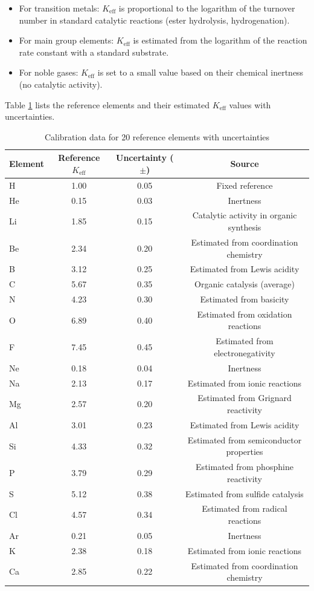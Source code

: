 \documentclass[12pt,a4paper]{article}
\theoremstyle{remark}
\newcommand{\Keff}{K_{\mathrm{eff}}}
\begin{document}
	\begin{itemize}
		\item For transition metals: $\Keff$ is proportional to the logarithm of the turnover number in standard catalytic reactions (ester hydrolysis, hydrogenation).
		\item For main group elements: $\Keff$ is estimated from the logarithm of the reaction rate constant with a standard substrate.
		\item For noble gases: $\Keff$ is set to a small value based on their chemical inertness (no catalytic activity).
	\end{itemize}
	
	Table \ref{tab:calibration} lists the reference elements and their estimated $\Keff$ values with uncertainties.
	
	\begin{table}[htbp]
		\centering
		\caption{Calibration data for 20 reference elements with uncertainties}
		\label{tab:calibration}
		\begin{tabular}{lccc}
			\toprule
			Element & Reference $\Keff$ & Uncertainty ($\pm$) & Source \\
			\midrule
			H & 1.00 & 0.05 & Fixed reference \\
			He & 0.15 & 0.03 & Inertness \\
			Li & 1.85 & 0.15 & Catalytic activity in organic synthesis \\
			Be & 2.34 & 0.20 & Estimated from coordination chemistry \\
			B & 3.12 & 0.25 & Estimated from Lewis acidity \\
			C & 5.67 & 0.35 & Organic catalysis (average) \\
			N & 4.23 & 0.30 & Estimated from basicity \\
			O & 6.89 & 0.40 & Estimated from oxidation reactions \\
			F & 7.45 & 0.45 & Estimated from electronegativity \\
			Ne & 0.18 & 0.04 & Inertness \\
			Na & 2.13 & 0.17 & Estimated from ionic reactions \\
			Mg & 2.57 & 0.20 & Estimated from Grignard reactivity \\
			Al & 3.01 & 0.23 & Estimated from Lewis acidity \\
			Si & 4.33 & 0.32 & Estimated from semiconductor properties \\
			P & 3.79 & 0.29 & Estimated from phosphine reactivity \\
			S & 5.12 & 0.38 & Estimated from sulfide catalysis \\
			Cl & 4.57 & 0.34 & Estimated from radical reactions \\
			Ar & 0.21 & 0.05 & Inertness \\
			K & 2.38 & 0.18 & Estimated from ionic reactions \\
			Ca & 2.85 & 0.22 & Estimated from coordination chemistry \\
			\bottomrule
		\end{tabular}
	\end{table}
	
\end{document}
